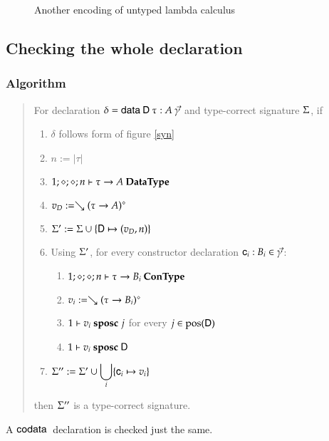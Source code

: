 \begin{figure}[htp]
\caption{Another encoding of untyped lambda calculus}
\label{abs2}
\end{figure}

\newpage

\subsection{Checking the whole declaration}

\subsubsection{Algorithm}
\begin{quote}
For declaration $\delta = \mathsf{data}\: \mathsf{D} \: \tau : A \: \vec{\gamma}$ and type-correct signature $\Sigma$, if 
\begin{enumerate}
\item 
$\delta$ follows form of figure \ref{syn}
\item
$ n := \vert\tau\vert $
\item
$1;\diamond;\diamond;n\vdash \tau \rightarrow A\:\mathbf{DataType}$ 
\item
$v_D := \searrow (\tau \rightarrow A)^{\diamond}$
\item
$\Sigma' := \Sigma \cup \{\mathsf{D} \mapsto (v_D,n)\}$
\item
Using $\Sigma'$, for every constructor declaration $\mathsf{c}_i : B_i  \in \vec{\gamma}$:
\begin{enumerate} 
\item
$1;\diamond;\diamond;n\vdash\tau \rightarrow B_i\:\mathbf{ConType}$ 
\item
$v_i := \searrow (\tau \rightarrow B_i)^{\diamond}$
\item
$1\vdash v_i\mbox{ \textbf{sposc} }j$ for every $j \in \mbox{pos}(\mathsf{D}) $ 
\item
$1\vdash v_i\mbox{ \textbf{sposc} }\mathsf{D}$ 
\end{enumerate}
\item
$\Sigma'' := \Sigma' \cup \displaystyle\bigcup_{i} \{\mathsf{c}_i \mapsto v_i\}$
\end{enumerate}
then $\Sigma''$ is a type-correct signature.
\end{quote}
A $\mathsf{codata}\:$ declaration is checked just the same.


